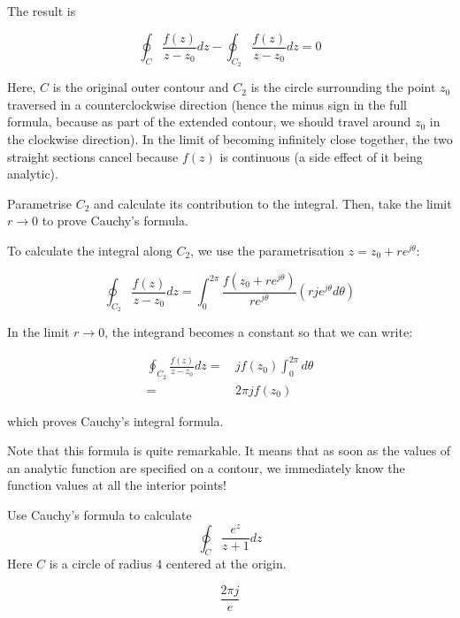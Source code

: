 The result is

\begin{equation}
\oint_{{C}} \frac{f(z)} {z-z_0} dz -\oint_{{C}_2} \frac{f(z)}
{z-z_0} dz=0
\end{equation} 

\noindent{}Here, ${C}$ is the original outer contour and ${C}_2$ is the circle surrounding the point $z_0$ traversed in a counterclockwise direction (hence the minus sign in the full formula, because as part of the extended contour, we should travel around $z_0$ in the clockwise direction). In the limit of becoming infinitely close together, the two straight sections cancel because $f(z)$ is continuous (a side effect of it being analytic).

\begin{cue}
Parametrise ${C}_2$ and calculate its contribution to the integral. Then, take the limit $ r \to 0 $ to prove Cauchy's formula.   
\end{cue}

To calculate the integral along ${C}_2$, we use the parametrisation $z=z_0 + r e^{j\theta}$:

\begin{equation}
\oint_{{C}_2} \frac{f(z)} {z-z_0} dz = \int_0^{2\pi} \frac{f(z_0
+ r e^{j\theta})} {r e^{j\theta}} \left(rje^{j \theta} d \theta\right)
\end{equation}

\noindent{}In the limit $ r \to 0 $, the integrand becomes a constant so that we can write:

\begin{align}
\oint_{{C}_2} \frac{f(z)} {z-z_0} dz = & \, j f(z_0)  \int_0^{2\pi} d \theta \nonumber \\
 = & \, 2 \pi j f(z_0)
\end{align}
 
which proves Cauchy's integral formula.

Note that this formula is quite remarkable. It means that as soon as the values of an analytic function are specified on a contour, we immediately know the function values at all the interior points!


\begin{exer}
Use Cauchy's formula to calculate 
$$\oint_{{C}}  \frac {e^z} {z+1} dz$$
Here ${C}$ is a circle of radius 4 centered at the origin.
\begin{sol}
$$\frac{2 \pi j}{e}$$
\end{sol}
\end{exer}

